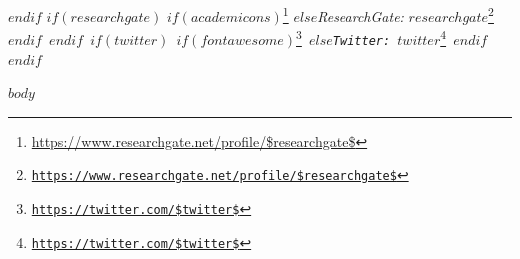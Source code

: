 \documentclass[
$if(fontsize)$
  $fontsize$,
$endif$
$if(lang)$
  $babel-lang$,
$endif$
$if(papersize)$
  $papersize$paper,
$endif$
$for(classoption)$
  $classoption$$sep$,
$endfor$
]{$documentclass$}
\DeclareRobustCommand{\href}[2]{#2\footnote{\url{#1}}}
\begin{document}
{{$endif$
$if(researchgate)$
  $if(academicons)$\href{https://www.researchgate.net/profile/$researchgate$}{\aiResearchGate} \hspace{1 mm}$else$\emph{ResearchGate:} \href{https://www.researchgate.net/profile/$researchgate$}{\tt $researchgate$} \hspace{1 mm}$endif$
$endif$
$if(twitter)$
  $if(fontawesome)$\href{https://twitter.com/$twitter$}{\faTwitter} \hspace{1 mm}$else$\emph{Twitter:} \href{https://twitter.com/$twitter$}{\tt $twitter$} \hspace{1 mm}$endif$
$endif$
  }%
}\par\vspace{1mm}%

$body$
\end{document}
